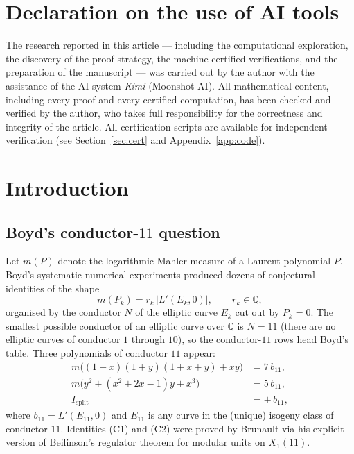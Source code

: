 \documentclass[11pt]{amsart}
\theoremstyle{definition}
\theoremstyle{remark}
\newcommand{\Q}{\mathbb{Q}}
\begin{document}
\section*{Declaration on the use of AI tools}
The research reported in this article --- including the computational
exploration, the discovery of the proof strategy, the machine-certified
verifications, and the preparation of the manuscript --- was carried out
by the author with the assistance of the AI system \emph{Kimi}
(Moonshot AI). All mathematical content, including every proof and
every certified computation, has been checked and verified by the
author, who takes full responsibility for the correctness and integrity
of the article. All certification scripts are available for independent
verification (see Section~\ref{sec:cert} and Appendix~\ref{app:code}).

\tableofcontents

\section{Introduction}

\subsection{Boyd's conductor-\texorpdfstring{$11$}{11} question}

Let $m(P)$ denote the logarithmic Mahler measure of a Laurent polynomial $P$.
Boyd's systematic numerical experiments \cite{Boyd98,Boyd2015} produced dozens of
conjectural identities of the shape
\[
  m(P_k)=r_k\,|L'(E_k,0)|,\qquad r_k\in\Q,
\]
organised by the conductor $N$ of the elliptic curve $E_k$ cut out by
$P_k=0$. The smallest possible conductor of an elliptic curve over $\Q$ is
$N=11$ (there are no elliptic curves of conductor $1$ through $10$), so the
conductor-$11$ rows head Boyd's table. Three polynomials of conductor $11$
appear:
\begin{align}
  m\big((1+x)(1+y)(1+x+y)+xy\big)&=7\,b_{11}, \tag{C1}\\
  m\big(y^2+(x^2+2x-1)y+x^3\big)&=5\,b_{11}, \tag{C2}\\
  I_{\mathrm{split}}&=\pm\,b_{11}, \tag{C3}
\end{align}
where $b_{11}=L'(E_{11},0)$ and $E_{11}$ is any curve in the (unique)
isogeny class of conductor $11$. Identities (C1) and (C2) were proved by
Brunault \cite{Brunault} via his explicit version of Beilinson's regulator
theorem for modular units on $X_1(11)$.
\end{document}
